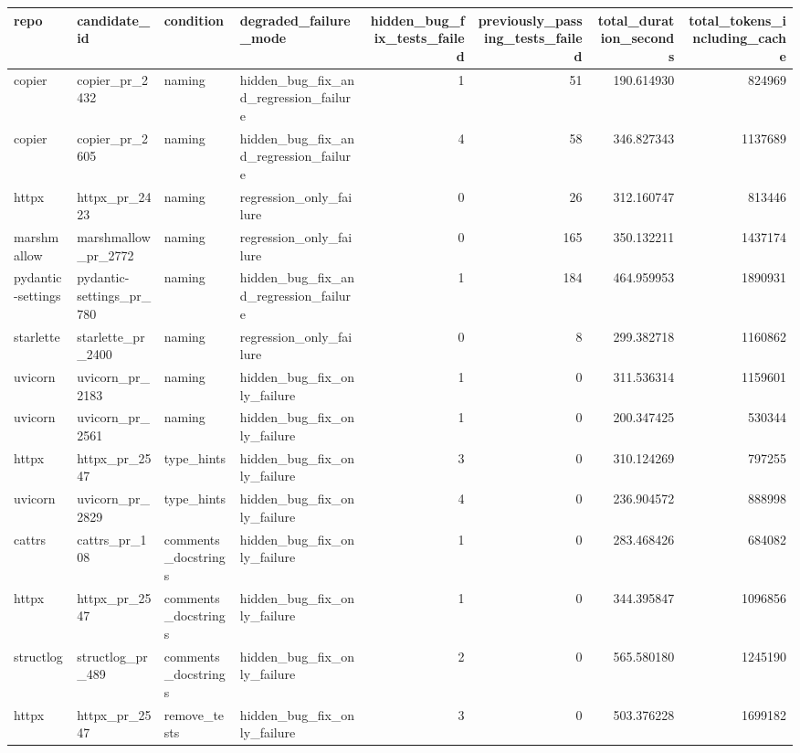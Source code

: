 \begin{tabular}{llllrrrr}
\toprule
repo & candidate\_id & condition & degraded\_failure\_mode & hidden\_bug\_fix\_tests\_failed & previously\_passing\_tests\_failed & total\_duration\_seconds & total\_tokens\_including\_cache \\
\midrule
copier & copier\_pr\_2432 & naming & hidden\_bug\_fix\_and\_regression\_failure & 1 & 51 & 190.614930 & 824969 \\
copier & copier\_pr\_2605 & naming & hidden\_bug\_fix\_and\_regression\_failure & 4 & 58 & 346.827343 & 1137689 \\
httpx & httpx\_pr\_2423 & naming & regression\_only\_failure & 0 & 26 & 312.160747 & 813446 \\
marshmallow & marshmallow\_pr\_2772 & naming & regression\_only\_failure & 0 & 165 & 350.132211 & 1437174 \\
pydantic-settings & pydantic-settings\_pr\_780 & naming & hidden\_bug\_fix\_and\_regression\_failure & 1 & 184 & 464.959953 & 1890931 \\
starlette & starlette\_pr\_2400 & naming & regression\_only\_failure & 0 & 8 & 299.382718 & 1160862 \\
uvicorn & uvicorn\_pr\_2183 & naming & hidden\_bug\_fix\_only\_failure & 1 & 0 & 311.536314 & 1159601 \\
uvicorn & uvicorn\_pr\_2561 & naming & hidden\_bug\_fix\_only\_failure & 1 & 0 & 200.347425 & 530344 \\
httpx & httpx\_pr\_2547 & type\_hints & hidden\_bug\_fix\_only\_failure & 3 & 0 & 310.124269 & 797255 \\
uvicorn & uvicorn\_pr\_2829 & type\_hints & hidden\_bug\_fix\_only\_failure & 4 & 0 & 236.904572 & 888998 \\
cattrs & cattrs\_pr\_108 & comments\_docstrings & hidden\_bug\_fix\_only\_failure & 1 & 0 & 283.468426 & 684082 \\
httpx & httpx\_pr\_2547 & comments\_docstrings & hidden\_bug\_fix\_only\_failure & 1 & 0 & 344.395847 & 1096856 \\
structlog & structlog\_pr\_489 & comments\_docstrings & hidden\_bug\_fix\_only\_failure & 2 & 0 & 565.580180 & 1245190 \\
httpx & httpx\_pr\_2547 & remove\_tests & hidden\_bug\_fix\_only\_failure & 3 & 0 & 503.376228 & 1699182 \\
\bottomrule
\end{tabular}
